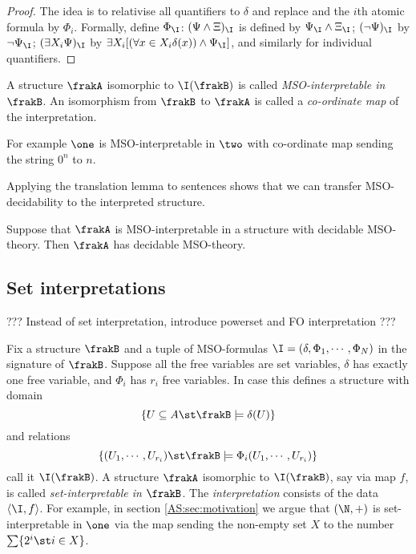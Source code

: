 \begin{proof}
The idea is to relativise all quantifiers to $\delta$ and replace and the $i$th atomic formula by $\Phi_i$.
Formally, define $\Phi_\I$: $(\Psi \wedge \Xi)_\I$ is defined by $\Psi_\I
\wedge \Xi_\I$; $(\neg \Psi)_\I$ by $\neg \Psi_\I$; $(\exists X_i \Psi)_\I$ by
$\exists X_i [ (\forall x \in X_i \delta(x)) \wedge \Psi_\I]$, and similarly for individual quantifiers. 
\end{proof}


A structure $\frakA$ isomorphic to $\I(\frakB)$ is called {\em
MSO-interpretable in $\frakB$}. An isomorphism from $\frakB$ to $\frakA$ is called a {\em co-ordinate map} of the interpretation. 

For example $\one$ is MSO-interpretable in $\two$ with co-ordinate map sending the string $0^n$ to $n$.

Applying the translation lemma to sentences shows that we can transfer MSO-decidability to the interpreted structure.

\begin{proposition}
Suppose that $\frakA$ is MSO-interpretable in a structure with decidable MSO-theory. Then $\frakA$ has decidable MSO-theory.
\end{proposition}

\subsection{Set interpretations}

??? Instead of set interpretation, introduce powerset and FO interpretation ???

Fix a structure $\frakB$ and a tuple of MSO-formulas $\I = (\delta, \Phi_1, \cdots, \Phi_N)$ in the signature of $\frakB$.
Suppose all the free variables are set variables, $\delta$ has exactly one free variable, and $\Phi_i$ has $r_i$ free variables.
In case this defines a structure with domain 
\[
\{U \subseteq {A} \st \frakB \models \delta(U)\}
\]
and relations
\[
\{(U_1,\cdots,U_{r_i}) \st \frakB \models \Phi_i(U_1,\cdots,U_{r_i})\}
\]
call it  $\I(\frakB)$.
A structure $\frakA$ isomorphic to $\I(\frakB)$, say via map $f$, is called {\em
set-interpretable in $\frakB$}. The {\em interpretation} consists of the data $\left<\I,f\right>$.
For example, in section \ref{AS:sec:motivation} we argue that $(\N,+)$ is set-interpretable in
$\one$ via the map sending the non-empty set $X$ to the number $\sum\{2^i \st i \in X\}$.


